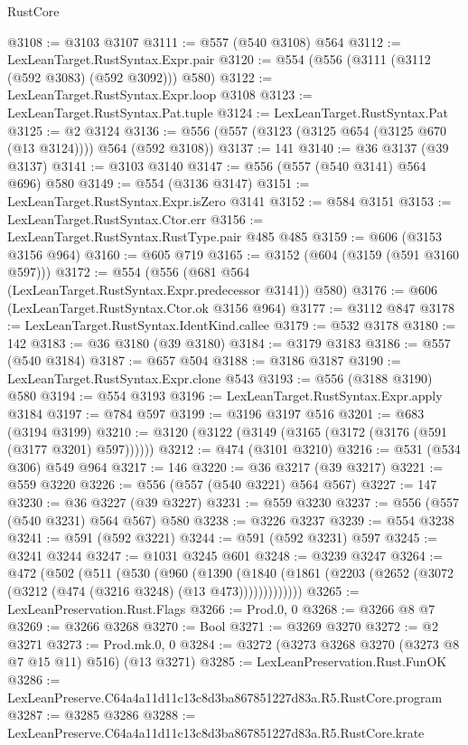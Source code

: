 \begin{lexlean}{RustCore}
\begin{coremodule}
@3108 := @3103 @3107
@3111 := @557 (@540 @3108) @564
@3112 := LexLeanTarget.RustSyntax.Expr.pair
@3120 := @554 (@556 (@3111 (@3112 (@592 @3083) (@592 @3092))) @580)
@3122 := LexLeanTarget.RustSyntax.Expr.loop @3108
@3123 := LexLeanTarget.RustSyntax.Pat.tuple
@3124 := LexLeanTarget.RustSyntax.Pat
@3125 := @2 @3124
@3136 := @556 (@557 (@3123 (@3125 @654 (@3125 @670 (@13 @3124)))) @564 (@592 @3108))
@3137 := 141
@3140 := @36 @3137 (@39 @3137)
@3141 := @3103 @3140
@3147 := @556 (@557 (@540 @3141) @564 @696) @580
@3149 := @554 (@3136 @3147)
@3151 := LexLeanTarget.RustSyntax.Expr.isZero @3141
@3152 := @584 @3151
@3153 := LexLeanTarget.RustSyntax.Ctor.err
@3156 := LexLeanTarget.RustSyntax.RustType.pair @485 @485
@3159 := @606 (@3153 @3156 @964)
@3160 := @605 @719
@3165 := @3152 (@604 (@3159 (@591 @3160 @597)))
@3172 := @554 (@556 (@681 @564 (LexLeanTarget.RustSyntax.Expr.predecessor @3141)) @580)
@3176 := @606 (LexLeanTarget.RustSyntax.Ctor.ok @3156 @964)
@3177 := @3112 @847
@3178 := LexLeanTarget.RustSyntax.IdentKind.callee
@3179 := @532 @3178
@3180 := 142
@3183 := @36 @3180 (@39 @3180)
@3184 := @3179 @3183
@3186 := @557 (@540 @3184)
@3187 := @657 @504
@3188 := @3186 @3187
@3190 := LexLeanTarget.RustSyntax.Expr.clone @543
@3193 := @556 (@3188 @3190) @580
@3194 := @554 @3193
@3196 := LexLeanTarget.RustSyntax.Expr.apply @3184
@3197 := @784 @597
@3199 := @3196 @3197 @516
@3201 := @683 (@3194 @3199)
@3210 := @3120 (@3122 (@3149 (@3165 (@3172 (@3176 (@591 (@3177 @3201) @597))))))
@3212 := @474 (@3101 @3210)
@3216 := @531 (@534 @306) @549 @964
@3217 := 146
@3220 := @36 @3217 (@39 @3217)
@3221 := @559 @3220
@3226 := @556 (@557 (@540 @3221) @564 @567)
@3227 := 147
@3230 := @36 @3227 (@39 @3227)
@3231 := @559 @3230
@3237 := @556 (@557 (@540 @3231) @564 @567) @580
@3238 := @3226 @3237
@3239 := @554 @3238
@3241 := @591 (@592 @3221)
@3244 := @591 (@592 @3231) @597
@3245 := @3241 @3244
@3247 := @1031 @3245 @601
@3248 := @3239 @3247
@3264 := @472
    (@502
      (@511
        (@530
          (@960
            (@1390
              (@1840 (@1861 (@2203 (@2652 (@3072 (@3212 (@474 (@3216 @3248) (@13 @473)))))))))))))
@3265 := LexLeanPreservation.Rust.Flags
@3266 := Prod.{0, 0}
@3268 := @3266 @8 @7
@3269 := @3266 @3268
@3270 := Bool
@3271 := @3269 @3270
@3272 := @2 @3271
@3273 := Prod.mk.{0, 0}
@3284 := @3272 (@3273 @3268 @3270 (@3273 @8 @7 @15 @11) @516) (@13 @3271)
@3285 := LexLeanPreservation.Rust.FunOK
@3286 := LexLeanPreserve.C64a4a11d11c13c8d3ba867851227d83a.R5.RustCore.program
@3287 := @3285 @3286
@3288 := LexLeanPreserve.C64a4a11d11c13c8d3ba867851227d83a.R5.RustCore.krate

\end{coremodule}
\end{lexlean}
